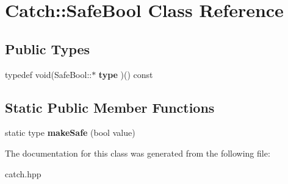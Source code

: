 \hypertarget{classCatch_1_1SafeBool}{
\section{Catch::SafeBool Class Reference}
\label{classCatch_1_1SafeBool}
}
\subsection*{Public Types}
\begin{DoxyCompactItemize}
\item 
\hypertarget{classCatch_1_1SafeBool_a14cd49eced5b255a1f59512d3b9395ae}{
typedef void(SafeBool::$\ast$ {\bfseries type} )() const }
\label{classCatch_1_1SafeBool_a14cd49eced5b255a1f59512d3b9395ae}

\end{DoxyCompactItemize}
\subsection*{Static Public Member Functions}
\begin{DoxyCompactItemize}
\item 
\hypertarget{classCatch_1_1SafeBool_af0ea63d9820f8bf7a8b76377913c4e77}{
static type {\bfseries makeSafe} (bool value)}
\label{classCatch_1_1SafeBool_af0ea63d9820f8bf7a8b76377913c4e77}

\end{DoxyCompactItemize}


The documentation for this class was generated from the following file:\begin{DoxyCompactItemize}
\item 
catch.hpp\end{DoxyCompactItemize}
